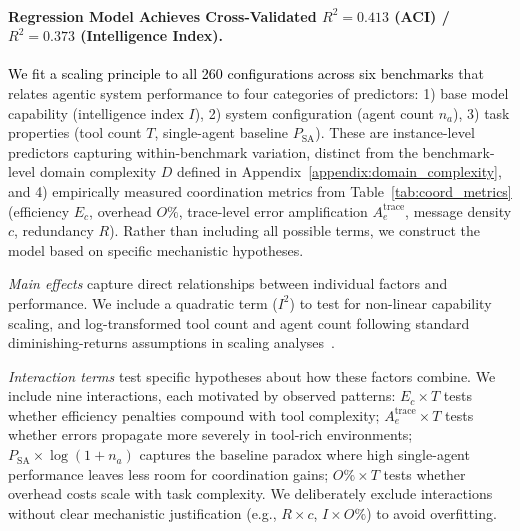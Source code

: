 \paragraph{Regression Model Achieves Cross-Validated $R^2{=}0.413$ (ACI) / $R^2{=}0.373$ (Intelligence Index).}
\textcolor{black}{We fit a scaling principle to all 260 configurations across six benchmarks} that relates agentic system performance to four categories of predictors: 1) base model capability (intelligence index $I$), 2) system configuration (agent count $n_a$), 3) task properties (tool count $T$, single-agent baseline $P_{\text{SA}}$). These are instance-level predictors capturing within-benchmark variation, distinct from the benchmark-level domain complexity $D$ defined in Appendix~\ref{appendix:domain_complexity}, and 4) empirically measured coordination metrics from Table~\ref{tab:coord_metrics} (efficiency $E_c$, overhead $O\%$, trace-level error amplification $A_e^{\text{trace}}$, message density $c$, redundancy $R$). Rather than including all possible terms, we construct the model based on specific mechanistic hypotheses.

\textit{Main effects} capture direct relationships between individual factors and performance. We include a quadratic term ($I^2$) to test for non-linear capability scaling, and log-transformed tool count and agent count following standard diminishing-returns assumptions in scaling analyses~\citep{kaplan2020scaling}.

\textit{Interaction terms} test specific hypotheses about how these factors combine. We include nine interactions, each motivated by observed patterns: $E_c \times T$ tests whether efficiency penalties compound with tool complexity; $A_e^{\text{trace}} \times T$ tests whether errors propagate more severely in tool-rich environments; $P_{\text{SA}} \times \log(1+n_a)$ captures the baseline paradox where high single-agent performance leaves less room for coordination gains; $O\% \times T$ tests whether overhead costs scale with task complexity. We deliberately exclude interactions without clear mechanistic justification (e.g., $R \times c$, $I \times O\%$) to avoid overfitting.

